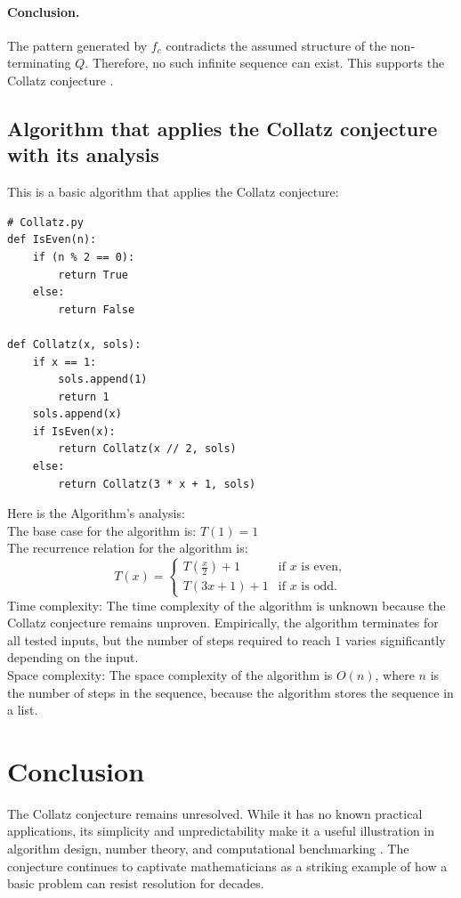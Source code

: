\documentclass{zc-ust-hw}
\begin{document}
\paragraph{Conclusion.} The pattern generated by \( f_c \) contradicts the assumed structure of the non-terminating \( Q \). Therefore, no such infinite sequence can exist. This supports the Collatz conjecture \cite{ref1}.
\subsection{Algorithm that applies the Collatz conjecture with its analysis}
This is a basic algorithm that applies the Collatz conjecture:
\begin{lstlisting}
# Collatz.py
def IsEven(n):
    if (n % 2 == 0):
        return True
    else:
        return False

def Collatz(x, sols):
    if x == 1:
        sols.append(1)
        return 1
    sols.append(x)
    if IsEven(x):
        return Collatz(x // 2, sols)
    else:
        return Collatz(3 * x + 1, sols)
\end{lstlisting}
Here is the Algorithm's analysis: \\
The base case for the algorithm is: $T(1) = 1$ \\
The recurrence relation for the algorithm is:
\[
  T(x) =
  \begin{cases}
    T\left(\frac{x}{2}\right) + 1 & \text{if } x \text{ is even}, \\
    T(3x + 1) + 1                 & \text{if } x \text{ is odd}.
  \end{cases}
\]
Time complexity:
The time complexity of the algorithm is unknown because the Collatz conjecture remains unproven. Empirically, the algorithm terminates for all tested inputs, but the number of steps required to reach $1$ varies significantly depending on the input. \\
Space complexity:
The space complexity of the algorithm is $O(n)$, where $n$ is the number of steps in the sequence, because the algorithm stores the sequence in a list.
\par\noindent\hrulefill
\section{Conclusion}
The Collatz conjecture remains unresolved. While it has no known practical applications, its simplicity and unpredictability make it a useful illustration in algorithm design, number theory, and computational benchmarking \cite{ref4}. The conjecture continues to captivate mathematicians as a striking example of how a basic problem can resist resolution for decades.
\par\noindent\hrulefill
\end{document}

